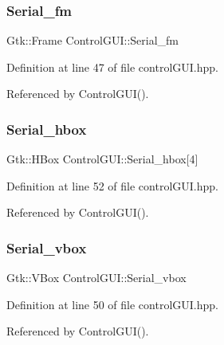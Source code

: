 \subsubsection{\texorpdfstring{Serial\+\_\+fm}{Serial\_fm}}
{\footnotesize\ttfamily Gtk\+::\+Frame Control\+G\+U\+I\+::\+Serial\+\_\+fm}



Definition at line 47 of file control\+G\+U\+I.\+hpp.



Referenced by Control\+G\+U\+I().

\mbox{\label{class_control_g_u_i_ad4d4fc47f141bc2138d82c1634667cb5}} 
\subsubsection{\texorpdfstring{Serial\+\_\+hbox}{Serial\_hbox}}
{\footnotesize\ttfamily Gtk\+::\+H\+Box Control\+G\+U\+I\+::\+Serial\+\_\+hbox\mbox{[}4\mbox{]}}



Definition at line 52 of file control\+G\+U\+I.\+hpp.



Referenced by Control\+G\+U\+I().

\mbox{\label{class_control_g_u_i_ab9016ebf268ba945ceefaa063c74df00}} 
\subsubsection{\texorpdfstring{Serial\+\_\+vbox}{Serial\_vbox}}
{\footnotesize\ttfamily Gtk\+::\+V\+Box Control\+G\+U\+I\+::\+Serial\+\_\+vbox}



Definition at line 50 of file control\+G\+U\+I.\+hpp.



Referenced by Control\+G\+U\+I().

\mbox{\label{class_control_g_u_i_a848cb9908ed55ec6d3ef9676d5c1dea6}} 
